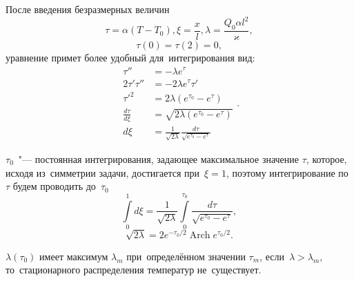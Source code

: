 После введения безразмерных величин
$$\tau = \alpha(T - T_0), \xi = \frac{x}{l}, \lambda = \frac{Q_0\alpha{}l^2}{\varkappa},$$
$$\tau(0) = \tau(2) = 0,$$
уравнение примет более удобный для~интегрирования вид:
$$\begin{aligned}
    \tau'' &= - \lambda{}e^{\tau} \\ 
    2\tau'\tau'' &= - 2\lambda{}e^{\tau}\tau' \\
    \tau'^2 &= 2\lambda{}(e^{\tau_0} - e^{\tau}) \\
    \frac{d\tau}{d\xi} &= \sqrt{2\lambda{}(e^{\tau_0} - e^{\tau})} \\
    d\xi &= \frac{1}{\sqrt{2\lambda}}\frac{d\tau}{\sqrt{e^{\tau_0} - e^{\tau}}}
\end{aligned}.$$

$\tau_0$~"--- постоянная интегрирования, задающее максимальное значение $\tau$, которое, исходя из~симметрии задачи, достигается при~$\xi = 1$, поэтому интегрирование по~$\tau$ будем проводить до~$\tau_0$
$$\int\limits_0^1d\xi = \frac{1}{\sqrt{2\lambda}}\int\limits_0^{\tau_0}\frac{d\tau}{\sqrt{e^{\tau_0} - e^{\tau}}},$$
$$\sqrt{2\lambda} = 2e^{-\tau_0/2}\operatorname{Arch}{e^{\tau_0/2}}.$$

$\lambda(\tau_0)$ имеет максимум $\lambda_m$ при~определённом значении $\tau_m$, если~$\lambda > \lambda_m$, то~стационарного распределения температур не~существует.


